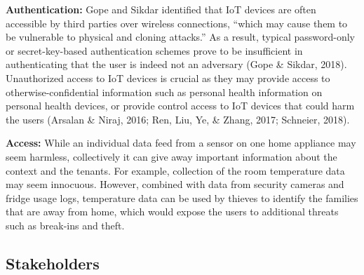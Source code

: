 {\bf Authentication:} Gope and Sikdar identified that IoT devices are often accessible by third parties over wireless connections, “which may cause them to be vulnerable to physical and cloning attacks.” As a result, typical password-only or secret-key-based authentication schemes prove to be insufficient in authenticating that the user is indeed not an adversary (Gope \& Sikdar, 2018). Unauthorized access to IoT devices is crucial as they may provide access to otherwise-confidential information such as personal health information on personal health devices, or provide control access to IoT devices that could harm the users (Arsalan \& Niraj, 2016; Ren, Liu, Ye, \& Zhang, 2017; Schneier, 2018).

{\bf Access:} While an individual data feed from a sensor on one home appliance may seem harmless, collectively it can give away important information about the context and the tenants. For example, collection of the room temperature data may seem innocuous. However, combined with data from security cameras and fridge usage logs, temperature data can be used by thieves to identify the families that are away from home, which would expose the users to additional threats such as break-ins and theft.

\subsection{Stakeholders}

